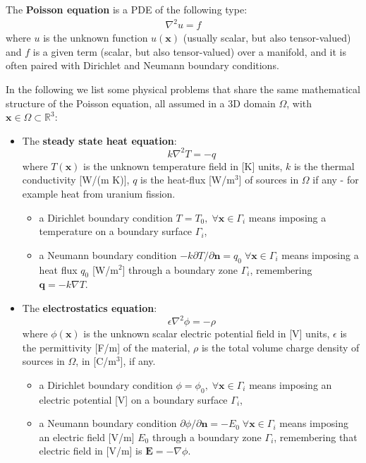 \documentclass{digitaldynamics}
\def\vect#1{\bm{#1}}
\begin{document}
The \textbf{Poisson equation} is a PDE of the following type:
\begin{align}
\nabla^2 u = f
\end{align}
where $u$ is the unknown function $u(\vect{x})$ (usually scalar, but also tensor-valued) and $f$ is a given term (scalar, but also tensor-valued) over a manifold,
and it is often paired with Dirichlet and Neumann boundary conditions.

In the following we list some physical problems that share the same mathematical structure of the Poisson equation, 
all assumed in a 3D domain $\Omega$, with $\vect{x} \in \Omega \subset \mathbb{R}^3$:

\begin{itemize}
	\item The \textbf{steady state heat equation}:
	\[
	k\nabla^2 T = -q
	\]
	where $T(\vect{x})$ is the unknown temperature field in [K] units, 
	$k$ is the thermal conductivity [W/(m K)], 
	$q$ is the heat-flux [W/m${}^3$] of sources in $\Omega$ if any - for example heat from uranium fission. 
	\begin{itemize}
		\item a Dirichlet boundary condition $T=T_0, \; \forall \vect{x}\in\Gamma_i$ means imposing a temperature on a boundary surface $\Gamma_i$, 
		\item a Neumann   boundary condition $-k\partial{T}/\partial{\vect{n}}=q_0 \; \forall \vect{x}\in\Gamma_i$ means imposing a heat flux $q_0$ [W/m${}^2$] through a boundary zone $\Gamma_i$, remembering $\vect{q}=-k \nabla T$.
	\end{itemize}
	
	
	\item The \textbf{electrostatics equation}:
	\[
	\epsilon \nabla^2 \phi = -\rho
	\]
	where $\phi(\vect{x})$ is the unknown scalar electric potential field in [V] units, 
	$\epsilon$ is the permittivity [F/m] of the material,
	$\rho$ is the total volume charge density of sources in $\Omega$, in [C/m$^3$], if any. 
	\begin{itemize}
		\item a Dirichlet boundary condition $\phi=\phi_0, \; \forall \vect{x}\in\Gamma_i$ means imposing an electric potential [V] on a boundary surface $\Gamma_i$, 
		\item a Neumann   boundary condition $\partial{\phi}/\partial{\vect{n}}=-E_0 \; \forall \vect{x}\in\Gamma_i$ means imposing an electric field [V/m] $E_0$ through a boundary zone $\Gamma_i$, remembering that electric field in [V/m] is $\vect{E}=-\nabla \phi$.
	\end{itemize}
	

\end{itemize}
\end{document}
